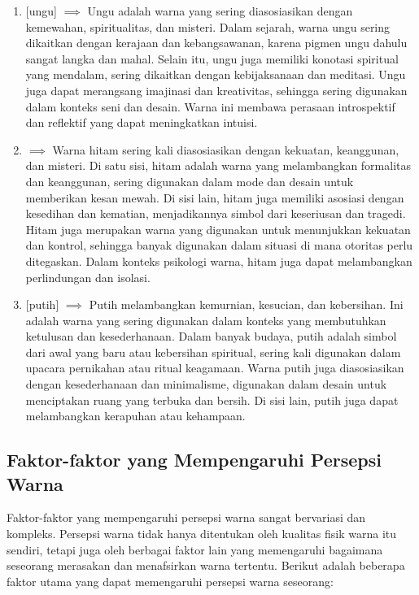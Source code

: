 \documentclass[a4paper]{article}
\newcommand{\warnalnbl}[1]{
  \tikz[baseline=-0.5\ht\strutbox]{
    \node[shape=rectangle, draw=black, fill=black, minimum height=1.5em, inner sep= 2pt, text=white]{#1}
  }
}
\begin{document}
\begin{enumerate}
  \item {}[ungu] $\implies$ Ungu adalah warna yang sering diasosiasikan dengan kemewahan, spiritualitas, dan misteri. Dalam sejarah, warna ungu sering dikaitkan dengan kerajaan dan kebangsawanan, karena pigmen ungu dahulu sangat langka dan mahal. Selain itu, ungu juga memiliki konotasi spiritual yang mendalam, sering dikaitkan dengan kebijaksanaan dan meditasi. Ungu juga dapat merangsang imajinasi dan kreativitas, sehingga sering digunakan dalam konteks seni dan desain. Warna ini membawa perasaan introspektif dan reflektif yang dapat meningkatkan intuisi.
  \item \warnalnbl{Hitam} $\implies$ Warna hitam sering kali diasosiasikan dengan kekuatan, keanggunan, dan misteri. Di satu sisi, hitam adalah warna yang melambangkan formalitas dan keanggunan, sering digunakan dalam mode dan desain untuk memberikan kesan mewah. Di sisi lain, hitam juga memiliki asosiasi dengan kesedihan dan kematian, menjadikannya simbol dari keseriusan dan tragedi. Hitam juga merupakan warna yang digunakan untuk menunjukkan kekuatan dan kontrol, sehingga banyak digunakan dalam situasi di mana otoritas perlu ditegaskan. Dalam konteks psikologi warna, hitam juga dapat melambangkan perlindungan dan isolasi.
  \item {}[putih] $\implies$ Putih melambangkan kemurnian, kesucian, dan kebersihan. Ini adalah warna yang sering digunakan dalam konteks yang membutuhkan ketulusan dan kesederhanaan. Dalam banyak budaya, putih adalah simbol dari awal yang baru atau kebersihan spiritual, sering kali digunakan dalam upacara pernikahan atau ritual keagamaan. Warna putih juga diasosiasikan dengan kesederhanaan dan minimalisme, digunakan dalam desain untuk menciptakan ruang yang terbuka dan bersih. Di sisi lain, putih juga dapat melambangkan kerapuhan atau kehampaan.
\end{enumerate}

\subsection{Faktor-faktor yang Mempengaruhi Persepsi Warna}
Faktor-faktor yang mempengaruhi persepsi warna sangat bervariasi dan kompleks. Persepsi warna tidak hanya ditentukan oleh kualitas fisik warna itu sendiri, tetapi juga oleh berbagai faktor lain yang memengaruhi bagaimana seseorang merasakan dan menafsirkan warna tertentu. Berikut adalah beberapa faktor utama yang dapat memengaruhi persepsi warna seseorang:
\end{document}

